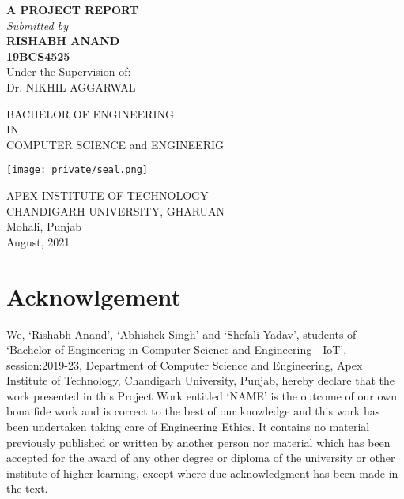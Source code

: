 \documentclass[14pt]{extarticle}
\title{}
\author{}
\date{}
\newcommand\frontmatter{
    \cleardoublepage
    \pagenumbering{roman}
}
\begin{document}
\frontmatter

\maketitle

\vspace{-7em}

\begin{center}
    \singlespacing
\textbf {A PROJECT REPORT} \\
\emph {Submitted by} \\
\textbf {RISHABH ANAND} \\
\textbf {19BCS4525 }   \\


\vspace{1.5em }
Under the Supervision of:\\
Dr. NIKHIL AGGARWAL

\singlespacing

BACHELOR OF ENGINEERING \\
IN \\
COMPUTER SCIENCE and ENGINEERIG

\vspace{1em}
\texttt{[image: private/seal.png]}

\singlespacing

APEX INSTITUTE OF TECHNOLOGY\\
CHANDIGARH UNIVERSITY, GHARUAN\\
Mohali, Punjab \\

\onehalfspacing
August, 2021

\end{center}
\restoregeometry

\newpage
{}
\section*{Acknowlgement}

We, ‘Rishabh Anand’, ‘Abhishek Singh’ and ‘Shefali Yadav’, students of ‘Bachelor of Engineering in Computer Science and Engineering - IoT’, session:2019-23, Department of Computer Science and Engineering, Apex Institute of Technology, Chandigarh University, Punjab, hereby declare that the work presented in this Project Work entitled ‘NAME’ is the outcome of our own bona fide work and is correct to the best of our knowledge and this work has been undertaken taking care of Engineering Ethics. It contains no material previously published or written by another person nor material which has been accepted for the award of any other degree or diploma of the university or other institute of higher learning, except where due acknowledgment has been made in the text.
\end{document}
